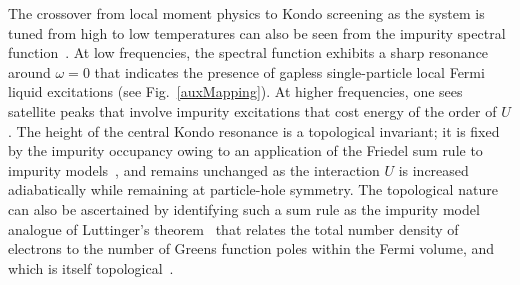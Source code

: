 The crossover from local moment physics to Kondo screening as the system is tuned from high to low temperatures can also be seen from the impurity spectral function~\cite{costi_hewson_1990,costi1991,takayama1993,Oliveira1994}. At low frequencies, the spectral function exhibits a sharp resonance around \(\omega=0\) that indicates the presence of gapless single-particle local Fermi liquid excitations (see Fig.~\ref{auxMapping}). At higher frequencies, one sees satellite peaks that involve impurity excitations that cost energy of the order of \(U\). The height of the central Kondo resonance is a topological invariant; it is fixed by the impurity occupancy owing to an application of the Friedel sum rule to impurity models~\cite{langreth1966}, and remains unchanged as the interaction \(U\) is increased adiabatically while remaining at particle-hole symmetry. The topological nature can also be ascertained by identifying such a sum rule as the impurity model analogue of Luttinger's theorem~\cite{luttinger1960fermi,luttinger1960ground,martin1982fermi} that relates the total number density of electrons to the number of Greens function poles within the Fermi volume, and which is itself topological~\cite{oshikawa2000topological,seki2017topological}.

